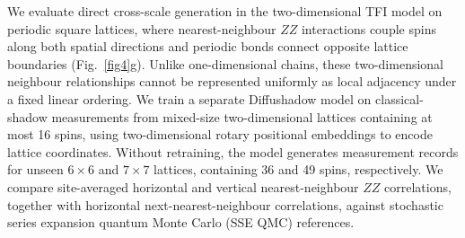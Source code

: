 \documentclass[pdflatex,sn-nature]{sn-jnl}%
\theoremstyle{thmstyleone}%
\theoremstyle{thmstyletwo}%
\theoremstyle{thmstylethree}%
\begin{document}




We evaluate direct cross-scale generation in the two-dimensional TFI model on periodic square lattices, where nearest-neighbour $ZZ$ interactions couple spins along both spatial directions and periodic bonds connect opposite lattice boundaries (Fig.~\ref{fig4}g). Unlike one-dimensional chains, these two-dimensional neighbour relationships cannot be represented uniformly as local adjacency under a fixed linear ordering. We train a separate Diffushadow model on classical-shadow measurements from mixed-size two-dimensional lattices containing at most 16 spins, using two-dimensional rotary positional embeddings to encode lattice coordinates. Without retraining, the model generates measurement records for unseen $6\times6$ and $7\times7$ lattices, containing 36 and 49 spins, respectively. We compare site-averaged horizontal and vertical nearest-neighbour $ZZ$ correlations, together with horizontal next-nearest-neighbour correlations, against stochastic series expansion quantum Monte Carlo (SSE QMC) references.

\end{document}
